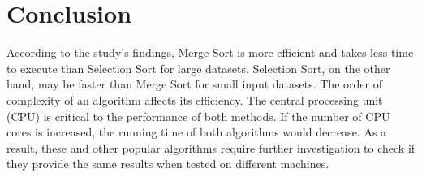 \documentclass[twocolumn]{article}
\begin{document}
\newpage
\section*{Conclusion}
According to the study's findings, Merge Sort is more efficient and takes less time to execute than Selection Sort for large datasets. Selection Sort, on the other hand, may be faster than Merge Sort for small input datasets. The order of complexity of an algorithm affects its efficiency. The central processing unit (CPU) is critical to the performance of both methods. If the number of CPU cores is increased, the running time of both algorithms would decrease. As a result, these and other popular algorithms require further investigation to check if they provide the same results when tested on different machines.



\end{document}
